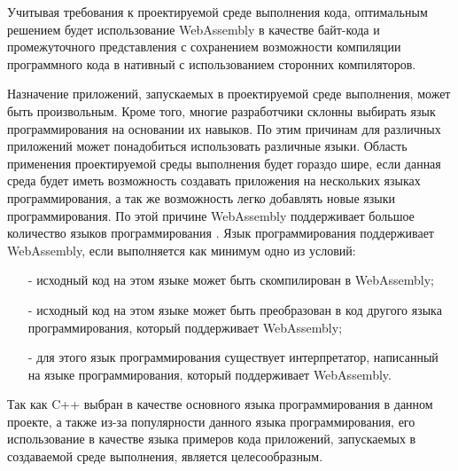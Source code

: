 Учитывая требования к проектируемой среде выполнения кода, оптимальным решением будет использование WebAssembly в качестве байт-кода и промежуточного представления с сохранением возможности компиляции программного кода в нативный с использованием сторонних компиляторов.

Назначение приложений, запускаемых в проектируемой среде выполнения, может быть произвольным. 
Кроме того, многие разработчики склонны выбирать язык программирования на основании их навыков.
По этим причинам для различных приложений может понадобиться использовать различные языки.
Область применения проектируемой среды выполнения будет гораздо шире, если данная среда будет иметь возможность создавать приложения на нескольких языках программирования, а так же возможность легко добавлять новые языки программирования.
По этой причине WebAssembly поддерживает большое количество языков программирования \cite{WASMLanguages}.
Язык программирования поддерживает WebAssembly, если выполняется как минимум одно из условий:
\begin{itemize}
    \item[-] исходный код на этом языке может быть скомпилирован в WebAssembly;
    \item[-] исходный код на этом языке может быть преобразован в код другого языка программирования, который поддерживает WebAssembly;
    \item[-] для этого язык программирования существует интерпретатор, написанный на языке программирования, который поддерживает WebAssembly.
\end{itemize}

Так как C++ выбран в качестве основного языка программирования в данном проекте, а также из-за популярности данного языка программирования, его использование в качестве языка примеров кода приложений, запускаемых в создаваемой среде выполнения, является целесообразным.
